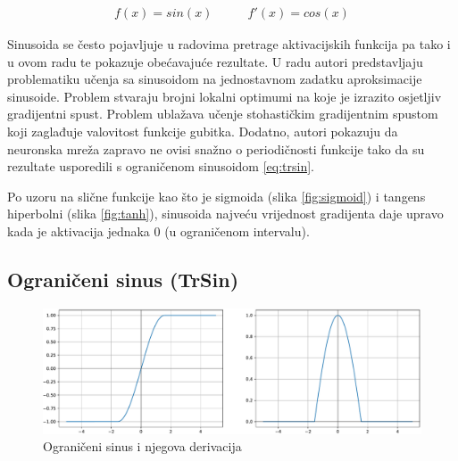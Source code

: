 \documentclass[times, utf8, numeric, diplomski]{fer}
\def\figref#1{(slika \ref{#1})}
\def\TODO#1{\noindent\textcolor{red}{TODO: \textit{#1}}\newline}
\def\todo#1{\TODO{#1}}
\begin{document}
\begin{equation}
\label{eq:sin}
\begin{split}
f(x) = sin(x)
\end{split}
\qquad
\begin{split}
f'(x) = cos(x)
\end{split}
\end{equation}


Sinusoida se često pojavljuje u radovima pretrage aktivacijskih funkcija \citep{elish} pa tako i u ovom radu te pokazuje obećavajuće rezultate. U radu \citet{taming_waves} autori predstavljaju problematiku učenja sa sinusoidom na jednostavnom zadatku aproksimacije sinusoide. Problem stvaraju brojni lokalni optimumi na koje je izrazito osjetljiv gradijentni spust. Problem ublažava učenje stohastičkim gradijentnim spustom koji zaglađuje valovitost funkcije gubitka. Dodatno, autori pokazuju da neuronska mreža zapravo ne ovisi snažno o periodičnosti funkcije tako da su rezultate usporedili s ograničenom sinusoidom \eqref{eq:trsin}.

Po uzoru na slične funkcije kao što je sigmoida \figref{fig:sigmoid} i tangens hiperbolni \figref{fig:tanh}, sinusoida najveću vrijednost gradijenta daje upravo kada je aktivacija jednaka 0 (u ograničenom intervalu).

\subsection{Ograničeni sinus (TrSin)}
\label{func:trsin}

\begin{figure}[H]
\includegraphics[width=\textwidth]{func_TrSin.pdf}
\centering
\caption{Ograničeni sinus i njegova derivacija}
\label{fig:trsin}
\end{figure}
\end{document}
